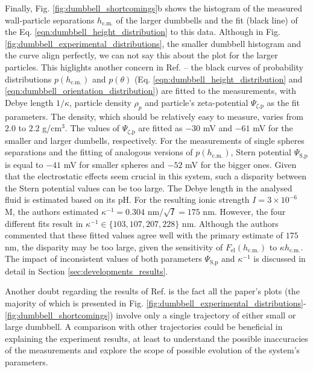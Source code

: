 \documentclass{master_thesis}
\begin{document}
Finally, Fig. \ref{fig:dumbbell_shortcomings}b shows the histogram of the measured wall-particle separations $h_{\textrm{c.m.}}$ of the larger dumbbells and the fit (black line) of the Eq. \eqref{eqn:dumbbell_height_distribution} to this data. Although in Fig. \ref{fig:dumbbell_experimental_distributions}, the smaller dumbbell histogram and the curve align perfectly, we can not say this about the plot for the larger particles. This higlights another concern in Ref. \cite{verweij2021} -- the black curves of probability distributions $p(h_{\textrm{c.m.}})$ and $p(\theta)$ (Eq. \eqref{eqn:dumbbell_height_distribution} and \eqref{eqn:dumbbell_orientation_distribution}) are fitted to the measurements, with Debye length $1/\kappa$, particle density $\rho_p$ and particle's zeta-potential $\Psi_{\zeta \textrm{,p}}$ as the fit parameters. The density, which should be relatively easy to measure, varies from $2.0$ to $2.2$ g/cm$^3$. The values of $\Psi_{\zeta \textrm{,p}}$ are fitted as $-30$ mV and $-61$ mV for the smaller and larger dumbells, respectively. For the measurements of single spheres separations and the fitting of analogous versions of $p(h_{\textrm{c.m.}})$, Stern potential $\Psi_{\textrm{S,p}}$ is equal to $-41$ mV for smaller spheres and $-52$ mV for the bigger ones. Given that the electrostatic effects seem crucial in this system, such a disparity between the Stern potential values can be too large. The Debye length in the analysed fluid is estimated based on its $\textrm{pH}$. For the resulting ionic strength $I = 3 \times 10^{-6}$ M, the authors estimated $\kappa^{-1} = 0.304\textrm{ nm}/\sqrt{I} = 175$ nm. However, the four different fits result in $\kappa^{-1} \in \{ 103, 107, 207, 228 \}$ nm. Although the authors commented that these fitted values agree well with the primary estimate of $175$ nm, the disparity may be too large, given the sensitivity of $F_{\textrm{el}}(h_{\textrm{c.m.}})$ to $\kappa h_{\textrm{c.m.}}$. The impact of inconsistent values of both parameters $\Psi_{\textrm{S,p}}$ and $\kappa^{-1}$ is discussed in detail in Section \ref{sec:developments_results}.

Another doubt regarding the results of Ref. \cite{verweij2021} is the fact all the paper's plots (the majority of which is presented in Fig. \ref{fig:dumbbell_experimental_distributions}-\ref{fig:dumbbell_shortcomings}) involve only a single trajectory of either small or large dumbbell. A comparison with other trajectories could be beneficial in explaining the experiment results, at least to understand the possible inaccuracies of the measurements and explore the scope of possible evolution of the system's parameters.
\end{document}

